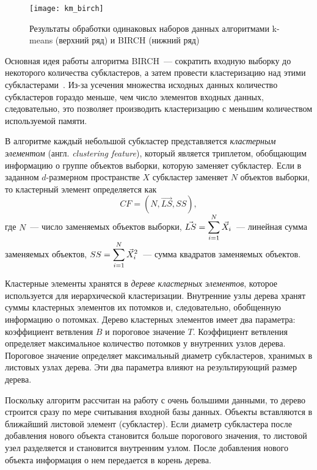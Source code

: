 \begin{figure}[h!]
    \centering
    \texttt{[image: km\_birch]}\\[1ex]
    \parbox{.9\textwidth}{\caption{Результаты обработки одинаковых наборов данных алгоритмами k-means (верхний ряд) и BIRCH (нижний ряд)} \label{pic:km-birch}}
\end{figure}

Основная идея работы алгоритма BIRCH~--- сократить входную выборку до некоторого количества субкластеров, а затем провести кластеризацию над этими субкластерами~\cite{cod}. Из-за усечения множества исходных данных количество субкластеров гораздо меньше, чем число элементов входных данных, следовательно, это позволяет производить кластеризацию с меньшим количеством используемой памяти.

В алгоритме каждый небольшой субкластер представляется \emph{кластерным элементом} (англ. \emph{clustering feature}), который является триплетом, обобщающим информацию о группе объектов выборки, которую заменяет субкластер. Если в заданном \( d \)-размерном пространстве \( X \) субкластер заменяет \( N \) объектов выборки, то кластерный элемент определяется как
\[
    CF = \left(N, \vec{LS}, SS\right),
\]
где \( N \)~--- число заменяемых объектов выборки, \( \displaystyle\vec{LS} = \sum_{i=1}^N \vec{X}_i \)~--- линейная сумма заменяемых объектов, \( \displaystyle SS = \sum_{i=1}^N \vec{X}_i^2 \)~--- сумма квадратов заменяемых объектов.

Кластерные элементы хранятся в \emph{дереве кластерных элементов}, которое используется для иерархической кластеризации. Внутренние узлы дерева хранят суммы кластерных элементов их потомков и, следовательно, обобщенную информацию о потомках. Дерево кластерных элементов имеет два параметра: коэффициент ветвления \( B \) и пороговое значение \( T \). Коэффициент ветвления определяет максимальное количество потомков у внутренних узлов дерева. Пороговое значение определяет максимальный диаметр субкластеров, хранимых в листовых узлах дерева. Эти два параметра влияют на результирующий размер дерева.

Поскольку алгоритм рассчитан на работу с очень большими данными, то дерево строится сразу по мере считывания входной базы данных. Объекты вставляются в ближайший листовой элемент (субкластер). Если диаметр субкластера после добавления нового объекта становится больше порогового значения, то листовой узел разделяется и становится внутренним узлом. После добавления нового объекта информация о нем передается в корень дерева.

